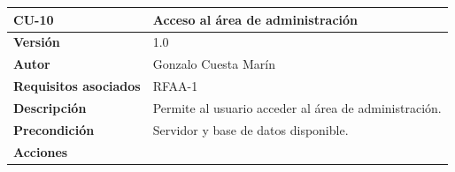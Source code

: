 \documentclass[
]{article}
\begin{document}
\begin{longtable}[]{@{}ll@{}}
\toprule
\begin{minipage}[b]{0.20\columnwidth}\raggedright
\textbf{CU-10}\strut
\end{minipage} & \begin{minipage}[b]{0.74\columnwidth}\raggedright
\textbf{Acceso al área de administración}\strut
\end{minipage}\tabularnewline
\midrule
\endhead
\begin{minipage}[t]{0.20\columnwidth}\raggedright
\textbf{Versión}\strut
\end{minipage} & \begin{minipage}[t]{0.74\columnwidth}\raggedright
1.0\strut
\end{minipage}\tabularnewline
\begin{minipage}[t]{0.20\columnwidth}\raggedright
\textbf{Autor}\strut
\end{minipage} & \begin{minipage}[t]{0.74\columnwidth}\raggedright
Gonzalo Cuesta Marín\strut
\end{minipage}\tabularnewline
\begin{minipage}[t]{0.20\columnwidth}\raggedright
\textbf{Requisitos asociados}\strut
\end{minipage} & \begin{minipage}[t]{0.74\columnwidth}\raggedright
RFAA-1\strut
\end{minipage}\tabularnewline
\begin{minipage}[t]{0.20\columnwidth}\raggedright
\textbf{Descripción}\strut
\end{minipage} & \begin{minipage}[t]{0.74\columnwidth}\raggedright
Permite al usuario acceder al área de administración.\strut
\end{minipage}\tabularnewline
\begin{minipage}[t]{0.20\columnwidth}\raggedright
\textbf{Precondición}\strut
\end{minipage} & \begin{minipage}[t]{0.74\columnwidth}\raggedright
Servidor y base de datos disponible.\strut
\end{minipage}\tabularnewline
\begin{minipage}[t]{0.20\columnwidth}\raggedright
\textbf{Acciones}\strut
\end{minipage} & \begin{minipage}[t]{0.74\columnwidth}\raggedright
\begin{enumerate}

\end{enumerate}
\end{minipage}
\end{longtable}
\end{document}
